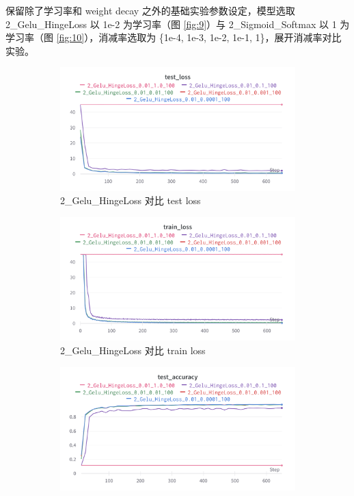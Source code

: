 \documentclass{article}
\begin{document}
保留除了学习率和 weight decay 之外的基础实验参数设定，模型选取 2\_Gelu\_HingeLoss 以 1e-2 为学习率（图 \ref{fig:9}）与 2\_Sigmoid\_Softmax 以 1 为学习率（图 \ref{fig:10}），消减率选取为 \{1e-4, 1e-3, 1e-2, 1e-1, 1\}，展开消减率对比实验。

\begin{figure}[htbp]
	\centering
	\begin{subfigure}{0.475\textwidth}
		\centering
		\includegraphics[width=1\textwidth]{../pics/消减率_2_Gelu_HingeLoss_test_loss.png}
		\caption{2\_Gelu\_HingeLoss 对比 test loss}
	\end{subfigure}
	\begin{subfigure}{0.475\textwidth}
		\centering
		\includegraphics[width=1\textwidth]{../pics/消减率_2_Gelu_HingeLoss_train_loss.png}
		\caption{2\_Gelu\_HingeLoss 对比 train loss}
	\end{subfigure}
	\begin{subfigure}{0.475\textwidth}
		\centering
		\includegraphics[width=1\textwidth]{../pics/消减率_2_Gelu_HingeLoss_test_acc.png}

\end{subfigure}
\end{figure}
\end{document}

